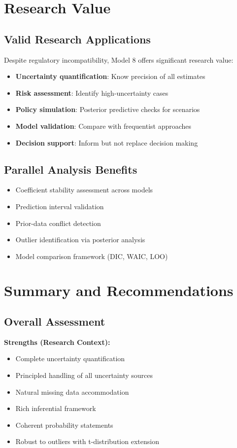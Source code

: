 \section{Research Value}

\subsection{Valid Research Applications}

Despite regulatory incompatibility, Model 8 offers significant research value:
\begin{itemize}
    \item \textbf{Uncertainty quantification}: Know precision of all estimates
    \item \textbf{Risk assessment}: Identify high-uncertainty cases
    \item \textbf{Policy simulation}: Posterior predictive checks for scenarios
    \item \textbf{Model validation}: Compare with frequentist approaches
    \item \textbf{Decision support}: Inform but not replace decision making
\end{itemize}

\subsection{Parallel Analysis Benefits}

\begin{itemize}
    \item Coefficient stability assessment across models
    \item Prediction interval validation
    \item Prior-data conflict detection
    \item Outlier identification via posterior analysis
    \item Model comparison framework (DIC, WAIC, LOO)
\end{itemize}

\section{Summary and Recommendations}

\subsection{Overall Assessment}

\textbf{Strengths (Research Context):}
\begin{itemize}
    \item Complete uncertainty quantification
    \item Principled handling of all uncertainty sources
    \item Natural missing data accommodation
    \item Rich inferential framework
    \item Coherent probability statements
    \item Robust to outliers with t-distribution extension
\end{itemize}

